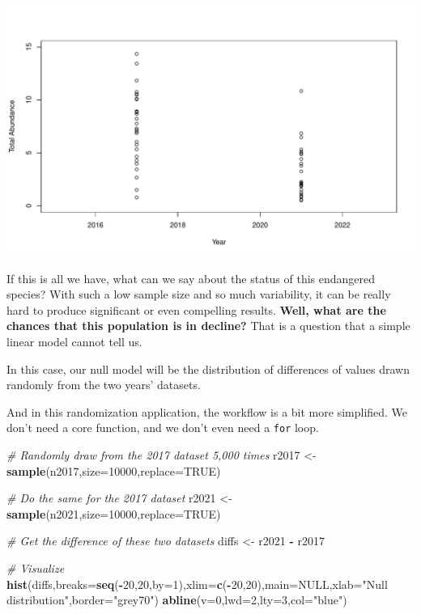 \documentclass[
]{book}
\newenvironment{Shaded}{\begin{snugshade}}{\end{snugshade}}
\newcommand{\CommentTok}[1]{\textcolor[rgb]{0.56,0.35,0.01}{\textit{#1}}}
\newcommand{\DataTypeTok}[1]{\textcolor[rgb]{0.13,0.29,0.53}{#1}}
\newcommand{\DecValTok}[1]{\textcolor[rgb]{0.00,0.00,0.81}{#1}}
\newcommand{\KeywordTok}[1]{\textcolor[rgb]{0.13,0.29,0.53}{\textbf{#1}}}
\newcommand{\NormalTok}[1]{#1}
\newcommand{\OperatorTok}[1]{\textcolor[rgb]{0.81,0.36,0.00}{\textbf{#1}}}
\newcommand{\OtherTok}[1]{\textcolor[rgb]{0.56,0.35,0.01}{#1}}
\newcommand{\StringTok}[1]{\textcolor[rgb]{0.31,0.60,0.02}{#1}}
\begin{document}
\includegraphics{figures/unnamed-chunk-308-1.pdf}

If this is all we have, what can we say about the status of this endangered species? With such a low sample size and so much variability, it can be really hard to produce significant or even compelling results. \textbf{Well, what are the chances that this population is in decline?} That is a question that a simple linear model cannot tell us.

In this case, our null model will be the distribution of differences of values drawn randomly from the two years' datasets.

And in this randomization application, the workflow is a bit more simplified. We don't need a core function, and we don't even need a \texttt{for} loop.

\begin{Shaded}
\begin{Highlighting}[]
\CommentTok{# Randomly draw from the 2017 dataset 5,000 times}
\NormalTok{r2017 <-}\StringTok{ }\KeywordTok{sample}\NormalTok{(n2017,}\DataTypeTok{size=}\DecValTok{10000}\NormalTok{,}\DataTypeTok{replace=}\OtherTok{TRUE}\NormalTok{)}

\CommentTok{# Do the same for the 2017 dataset}
\NormalTok{r2021 <-}\StringTok{ }\KeywordTok{sample}\NormalTok{(n2021,}\DataTypeTok{size=}\DecValTok{10000}\NormalTok{,}\DataTypeTok{replace=}\OtherTok{TRUE}\NormalTok{)}

\CommentTok{# Get the difference of these two datasets}
\NormalTok{diffs <-}\StringTok{ }\NormalTok{r2021 }\OperatorTok{-}\StringTok{ }\NormalTok{r2017}

\CommentTok{# Visualize}
\KeywordTok{hist}\NormalTok{(diffs,}\DataTypeTok{breaks=}\KeywordTok{seq}\NormalTok{(}\OperatorTok{-}\DecValTok{20}\NormalTok{,}\DecValTok{20}\NormalTok{,}\DataTypeTok{by=}\DecValTok{1}\NormalTok{),}\DataTypeTok{xlim=}\KeywordTok{c}\NormalTok{(}\OperatorTok{-}\DecValTok{20}\NormalTok{,}\DecValTok{20}\NormalTok{),}\DataTypeTok{main=}\OtherTok{NULL}\NormalTok{,}\DataTypeTok{xlab=}\StringTok{"Null distribution"}\NormalTok{,}\DataTypeTok{border=}\StringTok{"grey70"}\NormalTok{)}
\KeywordTok{abline}\NormalTok{(}\DataTypeTok{v=}\DecValTok{0}\NormalTok{,}\DataTypeTok{lwd=}\DecValTok{2}\NormalTok{,}\DataTypeTok{lty=}\DecValTok{3}\NormalTok{,}\DataTypeTok{col=}\StringTok{"blue"}\NormalTok{)}
\end{Highlighting}
\end{Shaded}
\end{document}
